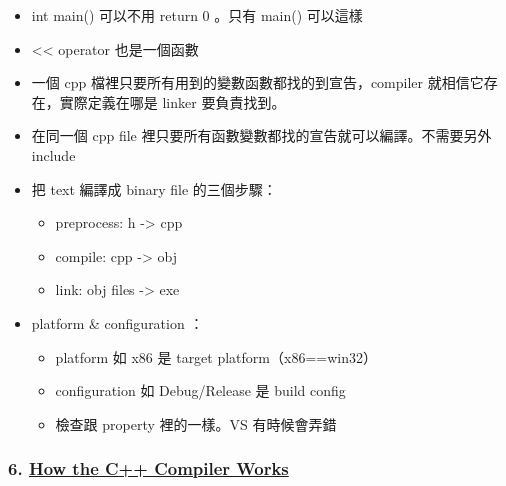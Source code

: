 \documentclass[11pt]{article}
\providecommand{\tightlist}{%
      \setlength{\itemsep}{0pt}\setlength{\parskip}{0pt}}
\begin{document}
\begin{itemize}
\tightlist
\item
  int main() 可以不用 return 0 。只有 main() 可以這樣
\item
  \textless\textless{} operator 也是一個函數
\item
  一個 cpp 檔裡只要所有用到的變數函數都找的到宣告，compiler
  就相信它存在，實際定義在哪是 linker 要負責找到。
\item
  在同一個 cpp file 裡只要所有函數變數都找的宣告就可以編譯。不需要另外
  include
\item
  把 text 編譯成 binary file 的三個步驟：

  \begin{itemize}
  \tightlist
  \item
    preprocess: h -\textgreater{} cpp
  \item
    compile: cpp -\textgreater{} obj
  \item
    link: obj files -\textgreater{} exe
  \end{itemize}
\item
  platform \& configuration ：

  \begin{itemize}
  \tightlist
  \item
    platform 如 x86 是 target platform（x86==win32）
  \item
    configuration 如 Debug/Release 是 build config
  \item
    檢查跟 property 裡的一樣。VS 有時候會弄錯
  \end{itemize}
\end{itemize}

\hypertarget{how-the-c-compiler-works}{%
\subsubsection{\texorpdfstring{6.
\href{https://www.youtube.com/watch?v=3tIqpEmWMLI\&list=PLlrATfBNZ98dudnM48yfGUldqGD0S4FFb\&index=7\&t=0s}{How
the C++ Compiler
Works}}{6. How the C++ Compiler Works}}\label{how-the-c-compiler-works}}
\end{document}
